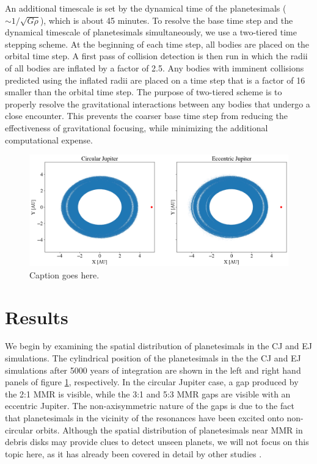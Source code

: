 \documentclass[onecolumn]{aastex63}
\begin{document}
An additional timescale is set by the dynamical time of the planetesimals ($\sim 1/\sqrt{G \rho}$), which is about 45 minutes. To 
resolve the base time step and the dynamical timescale of planetesimals simultaneously, we use a two-tiered time stepping scheme. 
At the beginning of each time step, all bodies are placed on the orbital time step. A first pass of collision detection is then run in 
which the radii of all bodies are inflated by a factor of 2.5. Any bodies with imminent collisions predicted using the inflated radii are 
placed on a time step that is a factor of 16 smaller than the orbital time step. The purpose of two-tiered scheme is to properly resolve 
the gravitational interactions between any bodies that undergo a close encounter. This prevents the coarser base time step from 
reducing the effectiveness of gravitational focusing, while minimizing the additional computational expense.

\begin{figure}
    \includegraphics[width=\textwidth]{figures/xy.png}
    \caption{Caption goes here.\label{fig:xy}}
\end{figure}

\section{Results} \label{sec:results}

We begin by examining the spatial distribution of planetesimals in the CJ and EJ simulations. The cylindrical position of the planetesimals 
in the the CJ and EJ simulations after 5000 years of integration are shown in the left and right hand panels of  figure \ref{fig:xy}, 
respectively. In the circular Jupiter case, a gap produced by the 2:1 MMR is visible, while the 3:1 and 5:3 MMR gaps are visible with an 
eccentric Jupiter. The non-axisymmetric nature of the gaps is due to the fact that planetesimals in the vicinity of the resonances have been 
excited onto non-circular orbits. Although the spatial distribution of planetesimals near MMR in debris disks may provide clues to detect 
unseen planets, we will not focus on this topic here, as it has already been covered in detail by other studies \citep{2016ApJ...818..159T, 
2018ApJ...857....3T}.
\end{document}
